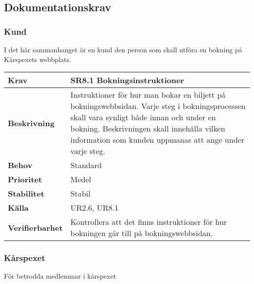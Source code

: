 \documentclass[a4paper, twoside, 11pt, titlepage]{article}
\begin{document}
	\subsection{Dokumentationskrav}



		\subsubsection{Kund}


		I det här sammanhanget är en kund den person som skall utföra en bokning på Kårspexets webbplats.

		\begin {table} [ht] \begin{tabular} { p{2.6cm} p{12.5cm} }
			\hline
			\sffamily\textbf{Krav} & \sffamily\textbf{SR8.1 Bokningsinstruktioner } \\
			\hline
			\sffamily\textbf{Beskrivning} & Instruktioner för hur man bokar en biljett på bokningswebbsidan. Varje steg i bokningsprocessen skall vara synligt både innan och under en bokning. Beskrivningen skall innehålla vilken information som kunden uppmanas att ange under varje steg.  \\
			\hline
			\sffamily\textbf{Behov} & Standard  \\
			\hline
			\sffamily\textbf{Prioritet} & Medel  \\
			\hline
			\sffamily\textbf{Stabilitet} & Stabil  \\
			\hline
			\sffamily\textbf{Källa} & UR2.6, UR8.1  \\
			\hline
			\sffamily\textbf{Verifierbarhet} & Kontrollera att det finns instruktioner för hur bokningen går till på bokningswebbsidan.  \\
			\hline
		\end{tabular} \end{table} \FloatBarrier


		\subsubsection{Kårspexet}


		För betrodda medlemmar i kårspexet
\end{document}
